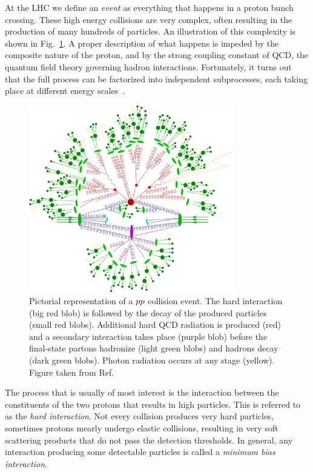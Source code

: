 
At the LHC we define an \textit{event} as everything that happens in a proton bunch crossing.
These high energy collisions are very complex, often resulting in the production of many hundreds of
particles. An illustration of this complexity is shown in Fig.~\ref{fig:event_full_event}.
A proper description of what happens is impeded by the composite nature of the proton, and by the
strong coupling constant of QCD, the quantum field theory governing hadron
interactions.
Fortunately, it turns out that the full process can be factorized into independent subprocesses,
each taking place at different energy scales~\cite{Skands:2011pf}. 


\begin{figure}[htpb]
  \centering
  \includegraphics[width=0.8\textwidth]{figures/eventreco_event/full_event}
  \caption{Pictorial representation of a ${p}{p}$ collision event.
The hard interaction (big red blob) is followed by the decay of the produced particles (small red
blobs).
Additional hard QCD radiation is produced (red) and a secondary interaction takes place (purple
blob) before the final-state partons hadronize (light green blobs) and hadrons decay (dark green
blobs). Photon radiation occurs at any stage (yellow). Figure taken from
Ref.~\cite{Gleisberg:2008ta}
  \label{fig:event_full_event}}
\end{figure}


The process that is usually of most interest is the interaction between the constituents of the two
protons that results in high \pt particles. This is referred to as the \textit{hard interaction}. 
Not every collision produces very hard particles, sometimes protons mearly undergo elastic
collisions, resulting in very soft scattering products that do not pass the detection thresholds. In
general, any interaction producing some detectable particles is called a \textit{minimum bias
interaction}. 

